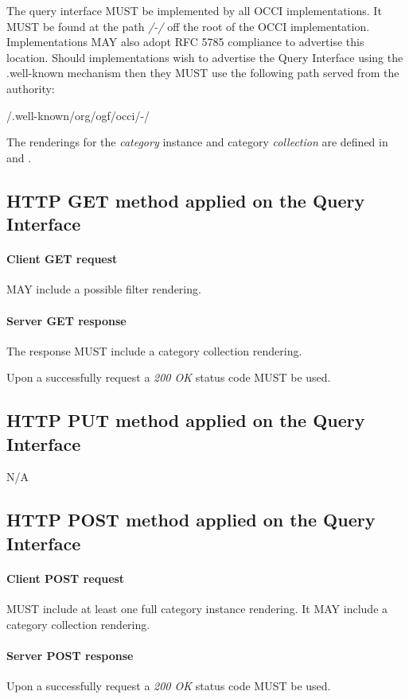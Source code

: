 \documentclass[10pt,a4paper]{article}
\begin{document}
The query interface MUST be implemented by all OCCI implementations. It MUST be found at the path \emph{/-/} off the root of the OCCI implementation. Implementations MAY also adopt RFC 5785 \cite{rfc5785} compliance to advertise this location. Should implementations wish to advertise the Query Interface using the .well-known mechanism then they MUST use the following path served from the authority:

	/.well-known/org/ogf/occi/-/

The renderings for the {\em category} instance and category {\em collection} are defined in \cite{occi:text} and \cite{occi:json}.

\subsection{HTTP GET method applied on the Query Interface}

\paragraph{Client GET request}
MAY include a possible filter rendering.

\paragraph{Server GET response}
The response MUST include a category collection rendering.

Upon a successfully request a \emph{200 OK} status code MUST be used.

\subsection{HTTP PUT method applied on the Query Interface}

N/A

\subsection{HTTP POST method applied on the Query Interface}

\paragraph{Client POST request}
MUST include at least one full category instance rendering. It MAY include a category collection rendering.

\paragraph{Server POST response}
Upon a successfully request a \emph{200 OK} status code MUST be used.
\end{document}
